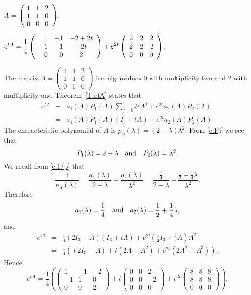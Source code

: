 \documentclass{ximera}
\begin{document}
\begin{computerExercise} \label{c12.1.8c}
$A = \left(\begin{array}{rrr} 1 & 1 & 2\\ 1 & 1 & 0 \\ 0 & 0 & 0
\end{array}\right)$.

\begin{solution}
\ans $e^{tA}= \displaystyle\frac{1}{4}\left(\begin{array}{rrc} 
1 & -1 & -2+2t\\ -1 & 1 & -2t \\ 0 & 0 & 2\end{array}\right) +e^{2t}\left(\begin{array}{rrr} 2 & 2 & 2\\  2 & 2 & 2 \\ 0 & 0 & 0 
\end{array}\right)$.

\soln The matrix 
$A = \left(\begin{array}{rrr} 1 & 1 & 2\\ 1 & 1 & 0 \\ 0 & 0 & 0
\end{array}\right)$ has eigenvalues $0$ with multiplicity two and $2$ 
with multiplicity one. Theorem~\ref{T:etA} states that 
\begin{eqnarray*}
e^{tA} & = & a_1(A)P_1(A)\sum_{j=0}^1t^jA^j + e^{2t}a_2(A)P_2(A)\\
 & = & a_1(A)P_1(A)(I_3+tA) + e^{2t}a_2(A)P_2(A).
\end{eqnarray*}
The characteristic polynomial of $A$ is $p_A(\lambda) =(2-\lambda)\lambda^2$.
From \eqref{e:Pj} we see that
\[
P_1(\lambda) = 2-\lambda \quad\mbox{and}\quad P_2(\lambda) = \lambda^2.
\]
We recall from \eqref{e:1/p} that 
\[
\frac{1}{p_A(\lambda)} = \frac{a_1(\lambda)}{2-\lambda} + 
\frac{a_2(\lambda)}{\lambda^2} = \frac{\frac{1}{4}}{2-\lambda}
+ \frac{\frac{1}{2}+\frac{1}{4}\lambda}{\lambda^2}.
\]
Therefore
\[
a_1(\lambda) = \frac{1}{4} \quad\mbox{and}\quad a_2(\lambda) = \frac{1}{2}+\frac{1}{4}\lambda,
\]
and
\begin{eqnarray*}
e^{tA} & = & \frac{1}{4}(2I_3-A)(I_3+tA) + 
e^{2t}\left(\frac{1}{2}I_3+\frac{1}{4}A\right)A^2\\
& = & \frac{1}{4}\left((2I_3-A)+t(2A-A^2)+e^{2t}(2A^2+A^3)\right).
\end{eqnarray*}
Hence
\[
e^{tA}= \frac{1}{4}\left(\left(\begin{array}{rrr} 1 & -1 & -2\\ -1 & 1 & 0 
\\ 0 & 0 & 2\end{array}\right)+t\left(\begin{array}{rrr} 0 & 0 & 2\\ 0 & 0 & -2
\\ 0 & 0 & 0 \end{array}\right)+e^{2t}\left(\begin{array}{rrr} 8 & 8 & 8\\ 
8 & 8 & 8 \\ 0 & 0 & 0\end{array}\right)\right).
\]


\end{solution}
\end{computerExercise}
\end{document}
